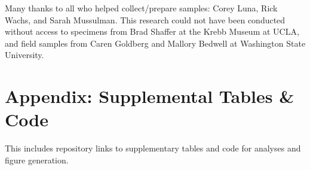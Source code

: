 \documentclass[proquest,12pt,final]{ucthesis-CA2012} %
\begin{document}
\begin{ucmainmatter}
Many thanks to all who helped collect/prepare samples: Corey Luna, Rick
Wachs, and Sarah Mussulman. This research could not have been conducted
without access to specimens from Brad Shaffer at the Krebb Museum at
UCLA, and field samples from Caren Goldberg and Mallory Bedwell at
Washington State University.

\appendix

\hypertarget{appendix-supplemental-tables-code}{%
\chapter{Appendix: Supplemental Tables \&
Code}\label{appendix-supplemental-tables-code}}

This includes repository links to supplementary tables and code for
analyses and figure generation.

\hypertarget{supptables}{%
}
\end{ucmainmatter}
\end{document}
